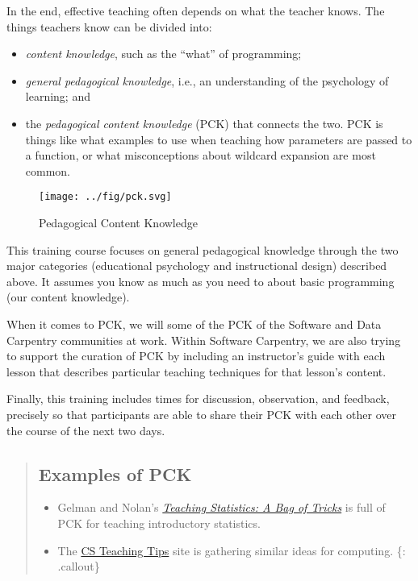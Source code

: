 In the end, effective teaching often depends on what the teacher knows.
The things teachers know can be divided into:

\begin{itemize}
\item
  \emph{content knowledge}, such as the ``what'' of programming;
\item
  \emph{general pedagogical knowledge}, i.e., an understanding of the
  psychology of learning; and
\item
  the \emph{pedagogical content knowledge} (PCK) that connects the two.
  PCK is things like what examples to use when teaching how parameters
  are passed to a function, or what misconceptions about wildcard
  expansion are most common.
\end{itemize}

\begin{figure}[htbp]
\centering
\texttt{[image: ../fig/pck.svg]}
\caption{Pedagogical Content Knowledge}
\end{figure}

This training course focuses on general pedagogical knowledge through
the two major categories (educational psychology and instructional
design) described above. It assumes you know as much as you need to
about basic programming (our content knowledge).

When it comes to PCK, we will  some
of the PCK of the Software and Data Carpentry communities at
work. Within Software Carpentry, we are also trying to support the
curation of PCK by including an instructor's guide with each lesson
that describes particular teaching techniques for that lesson's
content.

Finally, this training includes times for discussion, observation, and
feedback, precisely so that participants are able to share their PCK
with each other over the course of the next two days.

\begin{quote}
\subsection{Examples of PCK}\label{examples-of-pck}

\begin{itemize}
\itemsep1pt\parskip0pt
\item
  Gelman and Nolan's
  \emph{\href{http://www.amazon.com/Teaching-Statistics-Tricks-Andrew-Gelman/dp/0198572247/}{Teaching
  Statistics: A Bag of Tricks}} is full of PCK for teaching introductory
  statistics.
\item
  The \href{http://csteachingtips.org/}{CS Teaching Tips} site is
  gathering similar ideas for computing. \{: .callout\}
\end{itemize}
\end{quote}

